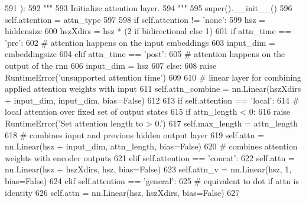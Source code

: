 \begin{DoxyCode}
591     ):
592         \textcolor{stringliteral}{"""}
593 \textcolor{stringliteral}{        Initialize attention layer.}
594 \textcolor{stringliteral}{        """}
595         super().\_\_init\_\_()
596         self.attention = attn\_type
597 
598         \textcolor{keywordflow}{if} self.attention != \textcolor{stringliteral}{'none'}:
599             hsz = hiddensize
600             hszXdirs = hsz * (2 \textcolor{keywordflow}{if} bidirectional \textcolor{keywordflow}{else} 1)
601             \textcolor{keywordflow}{if} attn\_time == \textcolor{stringliteral}{'pre'}:
602                 \textcolor{comment}{# attention happens on the input embeddings}
603                 input\_dim = embeddingsize
604             \textcolor{keywordflow}{elif} attn\_time == \textcolor{stringliteral}{'post'}:
605                 \textcolor{comment}{# attention happens on the output of the rnn}
606                 input\_dim = hsz
607             \textcolor{keywordflow}{else}:
608                 \textcolor{keywordflow}{raise} RuntimeError(\textcolor{stringliteral}{'unsupported attention time'})
609 
610             \textcolor{comment}{# linear layer for combining applied attention weights with input}
611             self.attn\_combine = nn.Linear(hszXdirs + input\_dim, input\_dim, bias=\textcolor{keyword}{False})
612 
613             \textcolor{keywordflow}{if} self.attention == \textcolor{stringliteral}{'local'}:
614                 \textcolor{comment}{# local attention over fixed set of output states}
615                 \textcolor{keywordflow}{if} attn\_length < 0:
616                     \textcolor{keywordflow}{raise} RuntimeError(\textcolor{stringliteral}{'Set attention length to > 0.'})
617                 self.max\_length = attn\_length
618                 \textcolor{comment}{# combines input and previous hidden output layer}
619                 self.attn = nn.Linear(hsz + input\_dim, attn\_length, bias=\textcolor{keyword}{False})
620                 \textcolor{comment}{# combines attention weights with encoder outputs}
621             \textcolor{keywordflow}{elif} self.attention == \textcolor{stringliteral}{'concat'}:
622                 self.attn = nn.Linear(hsz + hszXdirs, hsz, bias=\textcolor{keyword}{False})
623                 self.attn\_v = nn.Linear(hsz, 1, bias=\textcolor{keyword}{False})
624             \textcolor{keywordflow}{elif} self.attention == \textcolor{stringliteral}{'general'}:
625                 \textcolor{comment}{# equivalent to dot if attn is identity}
626                 self.attn = nn.Linear(hsz, hszXdirs, bias=\textcolor{keyword}{False})
627 
\end{DoxyCode}


